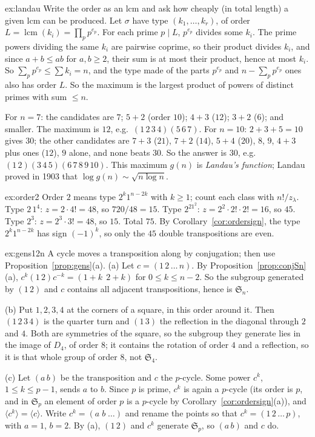 \begin{solution}{ex:landau}
\idea Write the order as an lcm and ask how cheaply (in total length) a given lcm can be produced.
\writeup Let $\sigma$ have type $(k_1,\dots,k_r)$, of order $L=\operatorname{lcm}(k_i)=\prod_pp^{e_p}$. For each prime $p\mid L$, $p^{e_p}$ divides some $k_i$. The prime powers dividing the same $k_i$ are pairwise coprime, so their product divides $k_i$, and since $a+b\le ab$ for $a,b\ge2$, their sum is at most their product, hence at most $k_i$. So $\sum_pp^{e_p}\le\sum k_i=n$, and the type made of the parts $p^{e_p}$ and $n-\sum_pp^{e_p}$ ones also has order $L$. So the maximum is the largest product of powers of distinct primes with sum $\le n$.

For $n=7$: the candidates are $7$; $5+2$ (order $10$); $4+3$ ($12$); $3+2$ ($6$); and smaller. The maximum is $12$, e.g.\ $(1\,2\,3\,4)(5\,6\,7)$. For $n=10$: $2+3+5=10$ gives $30$; the other candidates are $7+3$ ($21$), $7+2$ ($14$), $5+4$ ($20$), $8$, $9$, $4+3$ plus ones ($12$), $9$ alone, and none beats $30$. So the answer is $30$, e.g.\ $(1\,2)(3\,4\,5)(6\,7\,8\,9\,10)$. This maximum $g(n)$ is \emph{Landau's function}; Landau proved in 1903 that $\log g(n)\sim\sqrt{n\log n}$.
\end{solution}

\begin{solution}{ex:order2}
\idea Order $2$ means type $2^k1^{n-2k}$ with $k\ge1$; count each class with $n!/z_\lambda$.
\writeup Type $2\,1^4$: $z=2\cdot4!=48$, so $720/48=15$. Type $2^21^2$: $z=2^2\cdot2!\cdot2!=16$, so $45$. Type $2^3$: $z=2^3\cdot3!=48$, so $15$. Total $75$. By Corollary~\ref{cor:ordersign}, the type $2^k1^{n-2k}$ has sign $(-1)^k$, so only the $45$ double transpositions are even.
\end{solution}

\begin{solution}{ex:gens12n}
\idea A cycle moves a transposition along by conjugation; then use Proposition~\ref{prop:gens}(a).
\writeup (a) Let $c=(1\,2\,\dots\,n)$. By Proposition~\ref{prop:conjSn}(a), $c^k(1\,2)c^{-k}=(1+k\;\,2+k)$ for $0\le k\le n-2$. So the subgroup generated by $(1\,2)$ and $c$ contains all adjacent transpositions, hence is $\mathfrak S_n$.

(b) Put $1,2,3,4$ at the corners of a square, in this order around it. Then $(1\,2\,3\,4)$ is the quarter turn and $(1\,3)$ the reflection in the diagonal through $2$ and $4$. Both are symmetries of the square, so the subgroup they generate lies in the image of $D_4$, of order $8$; it contains the rotation of order $4$ and a reflection, so it is that whole group of order $8$, not $\mathfrak S_4$.

(c) Let $(a\,b)$ be the transposition and $c$ the $p$-cycle. Some power $c^k$, $1\le k\le p-1$, sends $a$ to $b$. Since $p$ is prime, $c^k$ is again a $p$-cycle (its order is $p$, and in $\mathfrak S_p$ an element of order $p$ is a $p$-cycle by Corollary~\ref{cor:ordersign}(a)), and $\langle c^k\rangle=\langle c\rangle$. Write $c^k=(a\;b\;\dots)$ and rename the points so that $c^k=(1\,2\,\dots\,p)$, with $a=1$, $b=2$. By (a), $(1\,2)$ and $c^k$ generate $\mathfrak S_p$, so $(a\,b)$ and $c$ do.
\end{solution}

